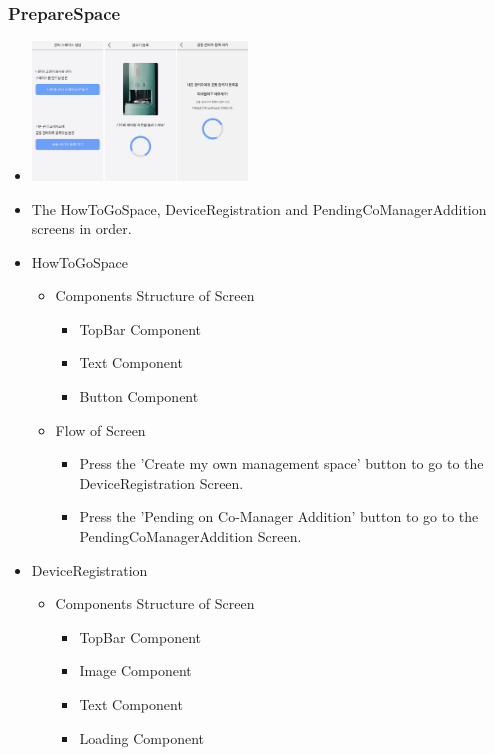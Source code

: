 \documentclass[conference]{IEEEtran}
\begin{document}
\subsubsection{PrepareSpace}
\begin{itemize}
    \item[] \includegraphics[width=0.45\textwidth]{img/Screen/7, 8.png}
    \item The HowToGoSpace, DeviceRegistration and PendingCoManagerAddition screens in order.
    \item HowToGoSpace
    \begin{itemize}
        \item Components Structure of Screen
        \begin{itemize}
            \item TopBar Component
            \item Text Component
            \item Button Component
        \end{itemize}
        \item Flow of Screen
        \begin{itemize}
            \item Press the 'Create my own management space' button to go to the DeviceRegistration Screen.
            \item Press the 'Pending on Co-Manager Addition' button to go to the PendingCoManagerAddition Screen.
            \\
        \end{itemize}
    \end{itemize}
    \item DeviceRegistration
    \begin{itemize}
        \item Components Structure of Screen
        \begin{itemize}
            \item TopBar Component
            \item Image Component
            \item Text Component
            \item Loading Component

\end{itemize}
\end{itemize}
\end{itemize}
\end{document}
